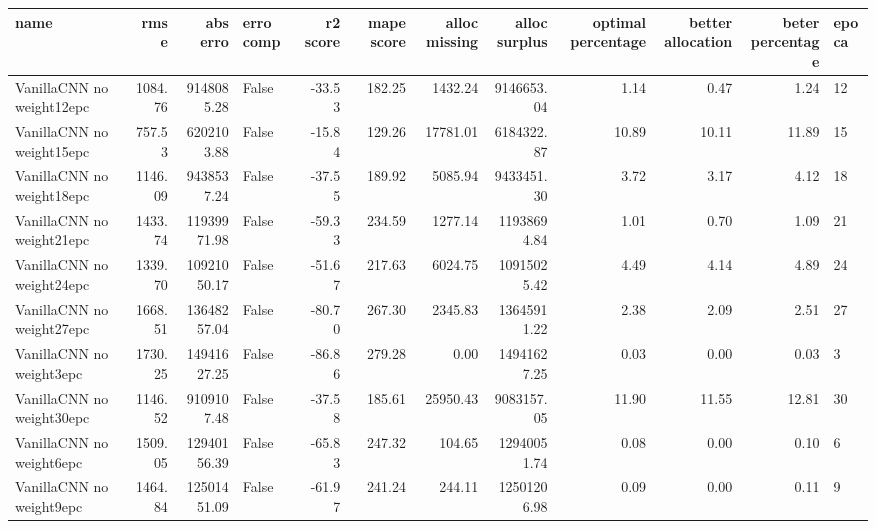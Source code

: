 \begin{tabular}{lrrlrrrrrrrl}
\toprule
name & rmse & abs erro & erro comp & r2 score & mape score & alloc missing & alloc surplus & optimal percentage & better allocation & beter percentage & epoca \\
\midrule
VanillaCNN no weight12epc & 1084.76 & 9148085.28 & False & -33.53 & 182.25 & 1432.24 & 9146653.04 & 1.14 & 0.47 & 1.24 & 12 \\
VanillaCNN no weight15epc & 757.53 & 6202103.88 & False & -15.84 & 129.26 & 17781.01 & 6184322.87 & 10.89 & 10.11 & 11.89 & 15 \\
VanillaCNN no weight18epc & 1146.09 & 9438537.24 & False & -37.55 & 189.92 & 5085.94 & 9433451.30 & 3.72 & 3.17 & 4.12 & 18 \\
VanillaCNN no weight21epc & 1433.74 & 11939971.98 & False & -59.33 & 234.59 & 1277.14 & 11938694.84 & 1.01 & 0.70 & 1.09 & 21 \\
VanillaCNN no weight24epc & 1339.70 & 10921050.17 & False & -51.67 & 217.63 & 6024.75 & 10915025.42 & 4.49 & 4.14 & 4.89 & 24 \\
VanillaCNN no weight27epc & 1668.51 & 13648257.04 & False & -80.70 & 267.30 & 2345.83 & 13645911.22 & 2.38 & 2.09 & 2.51 & 27 \\
VanillaCNN no weight3epc & 1730.25 & 14941627.25 & False & -86.86 & 279.28 & 0.00 & 14941627.25 & 0.03 & 0.00 & 0.03 & 3 \\
VanillaCNN no weight30epc & 1146.52 & 9109107.48 & False & -37.58 & 185.61 & 25950.43 & 9083157.05 & 11.90 & 11.55 & 12.81 & 30 \\
VanillaCNN no weight6epc & 1509.05 & 12940156.39 & False & -65.83 & 247.32 & 104.65 & 12940051.74 & 0.08 & 0.00 & 0.10 & 6 \\
VanillaCNN no weight9epc & 1464.84 & 12501451.09 & False & -61.97 & 241.24 & 244.11 & 12501206.98 & 0.09 & 0.00 & 0.11 & 9 \\
\bottomrule
\end{tabular}
